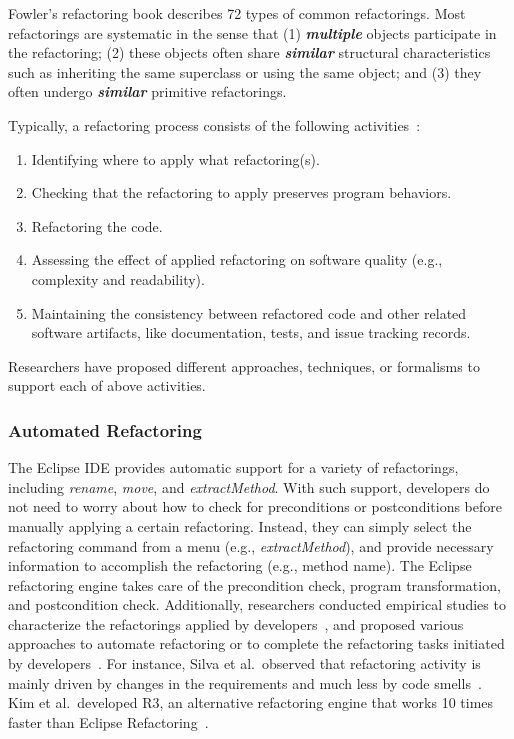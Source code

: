 \documentclass[runningheads,a4paper]{llncs}
\begin{document}
Fowler's refactoring book \cite{Fowler2000} describes 72 types of common refactorings. Most refactorings are systematic in the sense that (1) {\bf \em multiple} objects participate in the refactoring; (2) these objects often share {\bf \em similar} structural characteristics such as inheriting the same superclass or using the same object; and (3) they often undergo {\bf \em similar} primitive refactorings. 

Typically, a refactoring process consists of the following activities~\cite{Mens2004:SSR}:
\begin{enumerate}
\item Identifying where to apply what refactoring(s).
\item Checking that the refactoring to apply preserves program behaviors.
\item Refactoring the code.
\item Assessing the effect of applied refactoring on software quality (e.g., complexity and readability). 
\item Maintaining the consistency between refactored code and other related software artifacts, like documentation, tests, and issue tracking records.  
\end{enumerate}

Researchers have proposed different approaches, techniques, or formalisms to support each of above activities.

\subsubsection{Automated Refactoring} 


The Eclipse IDE provides automatic support for a variety of refactorings, including \emph{rename}, \emph{move}, and \emph{extractMethod}. With such support, developers do not need to worry about how to check for preconditions or postconditions before manually applying a certain refactoring. Instead, they can simply select the refactoring command from a menu (e.g., \emph{extractMethod}), and provide necessary information to accomplish the refactoring (e.g., method name). The Eclipse refactoring engine takes care of the precondition check, program transformation, and postcondition check. Additionally, 
researchers conducted empirical studies to characterize the refactorings applied by developers~\cite{Kim2012:FSR,Murphy-Hill2012:refactor,Vailian2012:misuse,Silva2016:WWR}, and proposed various approaches to automate refactoring or to complete the refactoring tasks initiated by developers~\cite{Griswold:1992,Balazinska1999,Dig:2009,Ge:2012,Chen:2013,Lee:2013,Tsantalis2013:icsm,Meng:2015,Kim:2016}. For instance, Silva et al.~observed that refactoring activity is mainly driven by changes in the requirements and much less by code smells~\cite{Silva2016:WWR}. Kim et al.~developed R3, an alternative refactoring engine that works 10 times faster than Eclipse Refactoring~\cite{Kim:2016}. 
\end{document}
